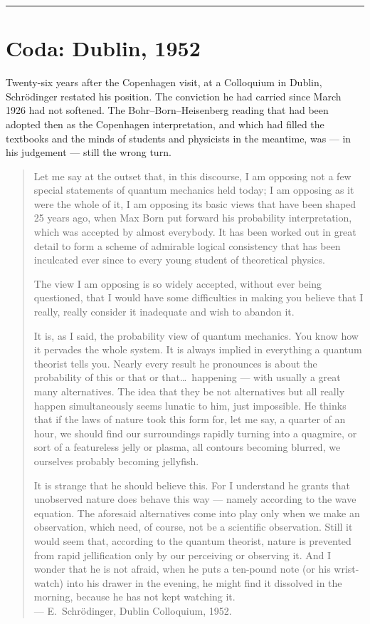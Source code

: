\bigskip
\hrule
\bigskip

\section*{Coda: Dublin, 1952}\label{sec:prologue-dublin}

Twenty-six years after the Copenhagen visit, at a Colloquium in Dublin, Schr\"odinger restated his position. The conviction he had carried since March 1926 had not softened. The Bohr--Born--Heisenberg reading that had been adopted then as the Copenhagen interpretation, and which had filled the textbooks and the minds of students and physicists in the meantime, was --- in his judgement --- still the wrong turn.

\begin{quote}
Let me say at the outset that, in this discourse, I am opposing not a few special statements of quantum mechanics held today; I am opposing as it were the whole of it, I am opposing its basic views that have been shaped 25 years ago, when Max Born put forward his probability interpretation, which was accepted by almost everybody. It has been worked out in great detail to form a scheme of admirable logical consistency that has been inculcated ever since to every young student of theoretical physics.

The view I am opposing is so widely accepted, without ever being questioned, that I would have some difficulties in making you believe that I really, really consider it inadequate and wish to abandon it.

It is, as I said, the probability view of quantum mechanics. You know how it pervades the whole system. It is always implied in everything a quantum theorist tells you. Nearly every result he pronounces is about the probability of this or that or that\ldots\ happening --- with usually a great many alternatives. The idea that they be not alternatives but all really happen simultaneously seems lunatic to him, just impossible. He thinks that if the laws of nature took this form for, let me say, a quarter of an hour, we should find our surroundings rapidly turning into a quagmire, or sort of a featureless jelly or plasma, all contours becoming blurred, we ourselves probably becoming jellyfish.

It is strange that he should believe this. For I understand he grants that unobserved nature does behave this way --- namely according to the wave equation. The aforesaid alternatives come into play only when we make an observation, which need, of course, not be a scientific observation. Still it would seem that, according to the quantum theorist, nature is prevented from rapid jellification only by our perceiving or observing it. And I wonder that he is not afraid, when he puts a ten-pound note (or his wrist-watch) into his drawer in the evening, he might find it dissolved in the morning, because he has not kept watching it.\\
\hfill --- E.~Schr\"odinger, Dublin Colloquium, 1952.
\end{quote}

